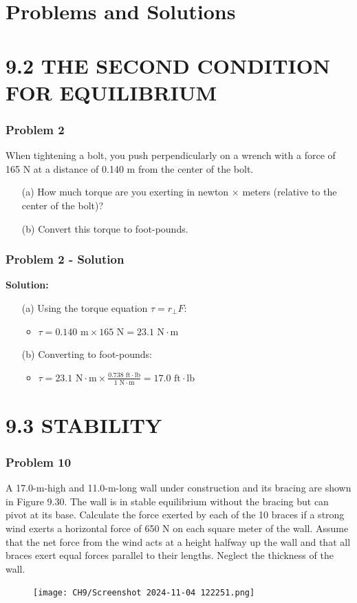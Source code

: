 \documentclass{beamer}
\begin{document}
\section{Problems and Solutions}

\section{9.2 THE SECOND CONDITION FOR EQUILIBRIUM}

\begin{frame}
\frametitle{Problem 2}
When tightening a bolt, you push perpendicularly on a wrench with a force of 165 N at a distance of 0.140 m from the center of the bolt.
\begin{itemize}
    \item[(a)] How much torque are you exerting in newton $\times$ meters (relative to the center of the bolt)?
    \item[(b)] Convert this torque to foot-pounds.
\end{itemize}
\end{frame}

\begin{frame}
\frametitle{Problem 2 - Solution}
\textbf{Solution:}
\begin{itemize}
    \item[(a)] Using the torque equation $\tau = r_\perp F$:
    \begin{itemize}
        \item $\tau = 0.140 \text{ m} \times 165 \text{ N} = 23.1 \text{ N} \cdot \text{m}$
    \end{itemize}
    \item[(b)] Converting to foot-pounds:
    \begin{itemize}
        \item $\tau = 23.1 \text{ N}\cdot\text{m} \times \frac{0.738 \text{ ft}\cdot\text{lb}}{1 \text{ N}\cdot\text{m}} = 17.0 \text{ ft}\cdot\text{lb}$
    \end{itemize}
\end{itemize}
\end{frame}

\section{9.3 STABILITY}

\begin{frame}
\frametitle{Problem 10}
A 17.0-m-high and 11.0-m-long wall under construction and its bracing are shown in Figure 9.30. The wall is in stable equilibrium without the bracing but can pivot at its base. Calculate the force exerted by each of the 10 braces if a strong wind exerts a horizontal force of 650 N on each square meter of the wall. Assume that the net force from the wind acts at a height halfway up the wall and that all braces exert equal forces parallel to their lengths. Neglect the thickness of the wall.
\begin{figure}[H]
    \centering
    \texttt{[image: CH9/Screenshot 2024-11-04 122251.png]}
\end{figure}

\end{frame}
\end{document}
